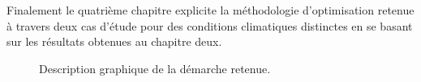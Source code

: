 Finalement le quatrième chapitre explicite la méthodologie d’optimisation retenue
à travers deux cas d’étude pour des conditions climatiques distinctes en se basant
sur les résultats obtenues au chapitre deux.

\begin{figure}
    \centering
    \caption{Description graphique de la démarche retenue.}
    \label{fig:plan_schematique}
\end{figure}




























